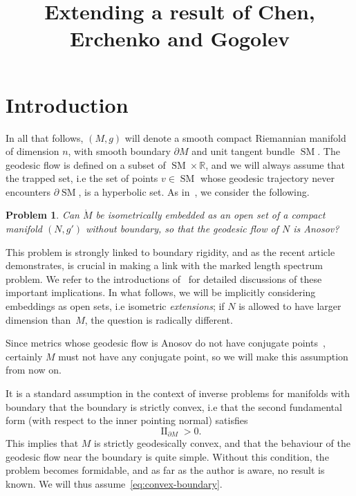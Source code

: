 \documentclass[AHL,Unicode,longabstracts,published]{cedram}
\title[Extending a result of Chen et al.]{Extending a result of Chen, Erchenko and Gogolev}
\author[\initial{Y.} \lastname{Guedes Bonthonneau}]{\firstname{Yannick} \lastname{Guedes Bonthonneau}}
\newcommand{\R}{\mathbb{R}}
\DeclareMathOperator{\II}{II}
\DeclareMathOperator{\SM}{SM}
\theoremstyle{plain}
\newtheorem{probl}{Problem}
\begin{document}
\maketitle


\section{Introduction}

In all that follows, $(M,g)$ will denote a smooth compact Riemannian manifold of dimension $n$, with smooth boundary $\partial M$ and unit tangent bundle $\SM$. The geodesic flow is defined on a subset of $\SM \times\R$, and we will always assume that the trapped set, i.e the set of points $v\in \SM$ whose geodesic trajectory never encounters $\partial \SM$, is a hyperbolic set. As in~\cite{Chen-Erchenko-Gogolev}, we consider the following.

\begin{probl}
\label{probA}
Can $\mathring{M}$ be isometrically embedded as an open set of a compact manifold $(N,g')$ without boundary, so that the geodesic flow of $N$ is Anosov?
\end{probl}

This problem is strongly linked to boundary rigidity, and as the recent article~\cite{Erchenko-Lefeuvre} demonstrates, is crucial in making a link with the marked length spectrum problem. We refer to the introductions of~\cite{Chen-Erchenko-Gogolev,Erchenko-Lefeuvre} for detailed discussions of these important implications. In what follows, we will be implicitly considering embeddings as open sets, i.e isometric \emph{extensions}; if $N$ is allowed to have larger dimension than~$M$, the question is radically different.


Since metrics whose geodesic flow is Anosov do not have conjugate points~\cite{Klingenberg-1974}, certainly $M$ must not have any conjugate point, so we will make this assumption from now on.

It is a standard assumption in the context of inverse problems for manifolds with boundary that the boundary is strictly convex, i.e that the second fundamental form (with respect to the inner pointing normal) satisfies
\begin{equation}\label{eq:convex-boundary}
\II_{\partial M} > 0.
\end{equation}
This implies that $M$ is strictly geodesically convex, and that the behaviour of the geodesic flow near the boundary is quite simple. Without this condition, the problem becomes formidable, and as far as the author is aware, no result is known. We will thus assume~\eqref{eq:convex-boundary}.
\end{document}
